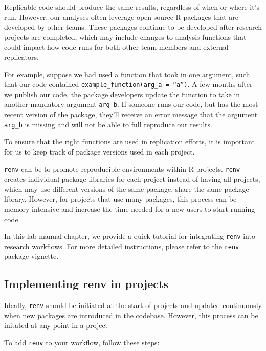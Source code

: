 \documentclass[
]{book}
\begin{document}
Replicable code should produce the same results, regardless of when or where it's run. However, our analyses often leverage open-source R packages that are developed by other teams. These packages continue to be developed after research projects are completed, which may include changes to analysis functions that could impact how code runs for both other team members and external replicators.

For example, suppose we had used a function that took in one argument, such that our code contained \texttt{example\_function(arg\_a\ =\ “a”)}. A few months after we publish our code, the package developers update the function to take in another mandatory argument \texttt{arg\_b}. If someone runs our code, but has the most recent version of the package, they'll receive an error message that the argument \texttt{arg\_b} is missing and will not be able to full reproduce our results.

To ensure that the right functions are used in replication efforts, it is important for us to keep track of package versions used in each project.

\texttt{renv} can be to promote reproducible environments within R projects. \texttt{renv} creates individual package libraries for each project instead of having all projects, which may use different versions of the same package, share the same package library. However, for projects that use many packages, this process can be memory intensive and increase the time needed for a new users to start running code.

In this lab manual chapter, we provide a quick tutorial for integrating \texttt{renv} into research workflows. For more detailed instructions, please refer to the \texttt{renv} package vignette.

\subsection{Implementing renv in projects}\label{implementing-renv-in-projects}

Ideally, \texttt{renv} should be initiated at the start of projects and updated continuously when new packages are introduced in the codebase. However, this process can be initated at any point in a project

To add \texttt{renv} to your workflow, follow these steps:
\end{document}

